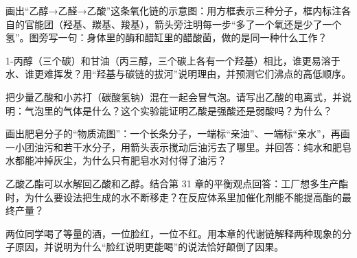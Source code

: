 \begin{sikaoti}
\item 画出“乙醇→乙醛→乙酸”这条氧化链的示意图：用方框表示三种分子，框内标注各自的官能团（羟基、羰基、羧基），箭头旁注明每一步“多了一个氧还是少了一个氢”。图旁写一句：身体里的酶和醋缸里的醋酸菌，做的是同一种什么工作？
\item 1-丙醇（三个碳）和甘油（丙三醇，三个碳上各有一个羟基）相比，谁更易溶于水、谁更难挥发？用“羟基与碳链的拔河”说明理由，并预测它们沸点的高低顺序。
\item 把少量乙酸和小苏打（碳酸氢钠）混在一起会冒气泡。请写出乙酸的电离式，并说明：气泡里的气体是什么？这个实验能证明乙酸是强酸还是弱酸吗？为什么？
\item 画出肥皂分子的“物质流图”：一个长条分子，一端标“亲油”、一端标“亲水”，再画一小团油污和若干水分子，用箭头表示搅动后油污去了哪里。并回答：纯水和肥皂水都能冲掉灰尘，为什么只有肥皂水对付得了油污？
\item 乙酸乙酯可以水解回乙酸和乙醇。结合第 31 章的平衡观点回答：工厂想多生产酯时，为什么要设法把生成的水不断移走？在反应体系里加催化剂能不能提高酯的最终产量？
\item 两位同学喝了等量的酒，一位脸红，一位不红。用本章的代谢链解释两种现象的分子原因，并说明为什么“脸红说明更能喝”的说法恰好颠倒了因果。
\end{sikaoti}
